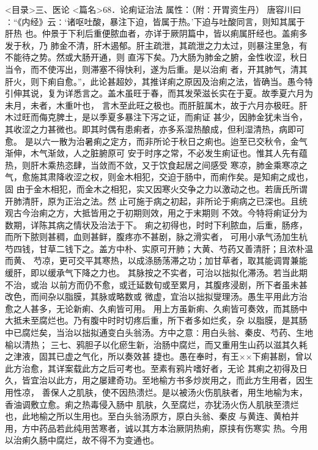 \documentclass[a4paper,12pt,UTF8,twoside]{ctexbook}
\begin{document}
<目录>三、医论
<篇名>68．论痢证治法
属性：（附∶开胃资生丹） 
唐容川曰∶“《内经》云∶‘诸呕吐酸，暴注下迫，皆属于热。’下迫与吐酸同言，则知其属于肝热 
也。仲景于下利后重便脓血者，亦详于厥阴篇中，皆以痢属肝经也。盖痢多发于秋，乃 
肺金不清，肝木遏郁。肝主疏泄，其疏泄之力太过，则暴注里急，有不能待之势。然或大肠开通，则 
直泻下矣。乃大肠为肺金之腑，金性收涩，秋日当令，而不使泻出，则滞塞不得快利，遂为后重。是以治痢 
者，开其肺气，清其肝火，则下痢自愈。”，此论甚超妙，其推详痢之原因及治痢之法，皆确当。愚今特 
引伸其说，复为详悉言之。盖木虽旺于春，而其发荣滋长实在于夏。故季夏六月为未月，未者，木重叶也， 
言木至此旺之极也。而肝脏属木，故于六月亦极旺。肝木过旺而侮克脾土，是以季夏多暴注下泻之证，而痢证 
甚少，因肺金犹未当令，其收涩之力甚微也。即其时偶有患痢者，亦多系湿热酿成，但利湿清热，病即可愈。 
是以六一散为治暑痢之定方，而非所论于秋日之痢也。迨至已交秋令，金气渐伸，木气渐敛，人之脏腑原可 
安于时序之常，不必发生痢证也。惟其人先有蕴热，则肝木乘热恣肆，当敛而不敛，又于饮食起居之间感受 
寒凉，肺金乘寒凉之气，愈施其肃降收涩之权，则金木相犯，交迫于肠中，而痢作矣。是知痢之成也，固 
由于金木相犯，而金木之相犯，实又因寒火交争之力以激动之也。若唐氏所谓开肺清肝，原为正治之法。然 
止可施于病之初起，非所论于痢病之已深也。且统观古今治痢之方，大抵皆用之于初期则效，用之于末期则 
不效。今特将痢证分为数期，详陈其病之情状及治法于下。 
痢之初得也，时时下利脓血，后重，肠疼，而所下脓则甚稠，血则甚鲜，腹疼亦不甚剧，脉之滑实者， 
可用小承气汤加生杭芍四钱，甘草二钱下之。盖方中朴、实原可开肺；大黄、芍药又善清肝；且浓朴温而黄、 
芍凉，更可交平其寒热，以成涤肠荡滞之功；加甘草者，取其能调胃兼能缓肝，即以缓承气下降之力也。 
其脉按之不实者，可治以拙拟化滞汤。若当此期不治，或治 
以前方而仍不愈，或迁延数旬或至累月，其腹疼浸剧，所下者虽未甚改色，而间杂以脂膜，其脉或略数或 
微虚，宜治以拙拟燮理汤。愚生平用此方治愈之人甚多，无论新痢、久痢皆可用。 
用上方虽新痢、久痢皆可奏效，而其肠中大抵未至腐烂也。乃有腹中时时切疼后重，所下者多如烂炙，杂 
以脂膜，是其肠中已腐烂矣，当治以拙拟通变白头翁汤。方中之意∶用白头翁、秦皮、芍药、生地榆以清热； 
三七、鸦胆子以化瘀生新，治肠中腐烂，而又重用生山药以滋其久耗之津液，固其已虚之气化，所以奏效甚 
捷也。愚在奉时，有王××下痢甚剧，曾以此方治愈，其详案载此方之后可考也。至素有鸦片嗜好者，无论 
其痢之初得及日久，皆宜治以此方，用之屡建奇功。至地榆方书多炒炭用之，而此方生用者，因生用性凉， 
善保人之肌肤，使不因热溃烂。是以被汤火伤肌肤者，用生地榆为末，香油调敷立愈。痢之热毒侵入肠中 
肌肤，久至腐烂，亦犹汤火伤人肌肤至溃烂也，此地榆之所以生用也。至白头翁汤原方，原白头翁、秦皮 
与黄连、黄柏并用，方中药品若此纯用苦寒者，诚以其方本治厥阴热痢，原挟有伤寒实 
热。今用以治痢久肠中腐烂，故不得不为变通也。 
\end{document}
